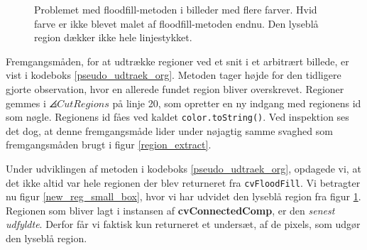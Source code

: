 {\begin{figure}[p]
    \setlength\fboxsep{0pt}
    \setlength\fboxrule{0.5pt}
    \centering
    \caption[]{Problemet med floodfill-metoden i billeder med flere
    farver. Hvid farve er ikke blevet malet af floodfill-metoden endnu.
    Den lyseblå region dækker ikke hele linjestykket.}
    \label{floodfill_taerskel_problem}
\end{figure}

Fremgangsmåden, for at udtrække regioner ved et snit i et arbitrært
billede, er vist i kodeboks \ref{pseudo_udtraek_org}. Metoden tager
højde for den tidligere gjorte observation, hvor en allerede fundet
region bliver overskrevet. Regioner gemmes i $\angles{CutRegions}$ på
linje 20, som opretter en ny indgang med regionens id som nøgle.
Regionens id fåes ved kaldet \texttt{color.toString()}. Ved
inspektion ses det dog, at denne fremgangsmåde lider under nøjagtig
samme svaghed som fremgangsmåden brugt i figur \ref{region_extract}.

Under udviklingen af metoden i kodeboks \ref{pseudo_udtraek_org},
opdagede vi, at det ikke altid var hele regionen der blev returneret fra
\texttt{cvFloodFill}. Vi betragter nu figur \ref{new_reg_small_box},
hvor vi har udvidet den lyseblå region fra figur
\ref{floodfill_taerskel_problem}. Regionen som bliver lagt i instansen
af \textbf{cvConnectedComp}, er den \emph{senest udfyldte}. Derfor får vi
faktisk kun returneret et undersæt, af de pixels, som udgør den lyseblå
region.

}
